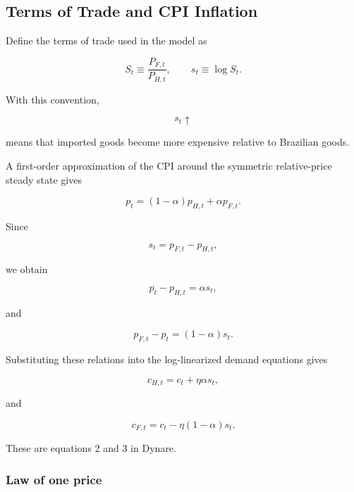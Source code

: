 \subsection{Terms of Trade and CPI Inflation}
\label{app:tot}

Define the terms of trade used in the model as

\begin{equation}
S_t
\equiv
\frac{P_{F,t}}{P_{H,t}},
\qquad
s_t\equiv\log S_t.
\label{eq:s_definition}
\end{equation}

With this convention,

\[
s_t\uparrow
\]

means that imported goods become more expensive relative to Brazilian goods.

A first-order approximation of the CPI around the symmetric relative-price
steady state gives

\begin{equation}
p_t
=
(1-\alpha)p_{H,t}
+
\alpha p_{F,t}.
\end{equation}

Since

\[
s_t=p_{F,t}-p_{H,t},
\]

we obtain

\begin{equation}
p_t-p_{H,t}
=
\alpha s_t,
\label{eq:p_pH}
\end{equation}

and

\begin{equation}
p_{F,t}-p_t
=
(1-\alpha)s_t.
\label{eq:pF_p}
\end{equation}

Substituting these relations into the log-linearized demand equations gives

\begin{equation}
\boxed{
c_{H,t}
=
c_t+\eta\alpha s_t,
}
\label{eq:ch_final}
\end{equation}

and

\begin{equation}
\boxed{
c_{F,t}
=
c_t-\eta(1-\alpha)s_t.
}
\label{eq:cf_final}
\end{equation}

These are equations 2 and 3 in Dynare.

\subsubsection{Law of one price}

